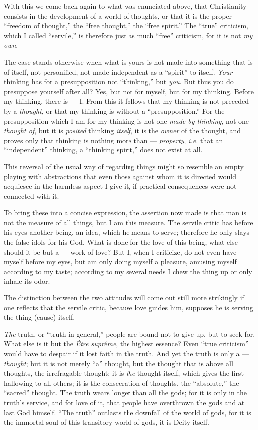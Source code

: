 With this we come back again to what was enunciated above, that Christianity 
consists in the development of a world of thoughts, or that it is the proper 
``freedom of thought,'' the ``free thought,'' the ``free spirit.'' The 
``true'' criticism, which I called ``servile,'' is therefore just as much 
``free'' criticism, for it is not \textit{my own}.

The case stands otherwise when what is yours is not made into something that 
is of itself, not personified, not made independent as a ``spirit'' to 
itself. \textit{Your} thinking has for a presupposition not ``thinking,'' 
but \textit{you}. But thus you do presuppose yourself after all? Yes, but not 
for myself, but for my thinking. Before my thinking, there is --- I. From this 
it follows that my thinking is not preceded by a \textit{thought}, or that my 
thinking is without a ``presupposition.'' For the presupposition which I am 
for my thinking is not one \textit{made by thinking}, not one \textit{thought 
of}, but it is \textit{posited} thinking \textit{itself}, it is the 
\textit{owner} of the thought, and proves only that thinking is nothing more 
than --- \textit{property}, \textit{i.e.} that an ``independent'' thinking, 
a ``thinking spirit,'' does not exist at all.

 This reversal of the usual way of regarding things might so resemble an empty 
playing with abstractions that even those against whom it is directed would 
acquiesce in the harmless aspect I give it, if practical consequences were not 
connected with it.

To bring these into a concise expression, the assertion now made is that man 
is not the measure of all things, but I am this measure. The servile critic 
has before his eyes another being, an idea, which he means to serve; therefore 
he only slays the false idols for his God. What is done for the love of this 
being, what else should it be but a --- work of love? But I, when I criticize, 
do not even have myself before my eyes, but am only doing myself a pleasure, 
amusing myself according to my taste; according to my several needs I chew the 
thing up or only inhale its odor.

The distinction between the two attitudes will come out still more strikingly 
if one reflects that the servile critic, because love guides him, supposes he 
is serving the thing (cause) itself.

\textit{The} truth, or ``truth in general,'' people are bound not to give 
up, but to seek for. What else is it but the \textit{\^Etre supr\^eme}, the 
highest essence? Even ``true criticism'' would have to despair if it lost 
faith in the truth. And yet the truth is only a --- \textit{thought}; but it is 
not merely ``a'' thought, but the thought that is above all thoughts, the 
irrefragable thought; it is \textit{the} thought itself, which gives the first 
hallowing to all others; it is the consecration of thoughts, the 
``absolute,'' the ``sacred'' thought. The truth wears longer than all the 
gods; for it is only in the truth's service, and for love of it, that people 
have overthrown the gods and at last God himself. ``The truth'' outlasts the 
downfall of the world of gods, for it is the immortal soul of this transitory 
world of gods, it is Deity itself.


